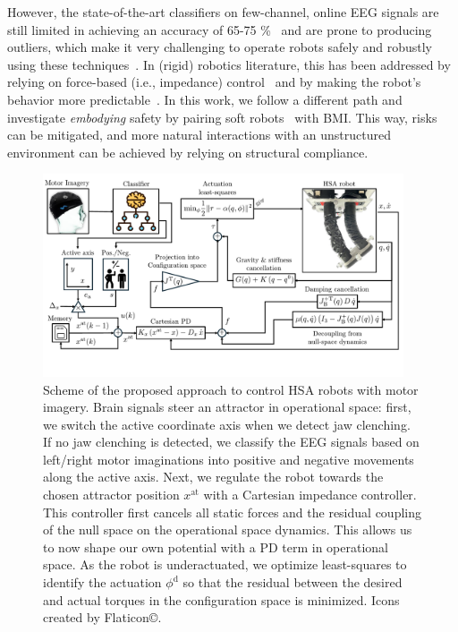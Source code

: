 \documentclass[letterpaper, 10pt, conference]{ieeeconf}      %
\begin{document}
However, the state-of-the-art classifiers on few-channel, online \gls{EEG} signals are still limited in achieving an accuracy of 65-75 \si{\percent}~\cite{arpaia2022non, lee2024noir} and are prone to producing outliers, which make it very challenging to operate robots safely and robustly using these techniques~\cite{liu2024cognitive}. In (rigid) robotics literature, this has been addressed by relying on force-based (i.e., impedance) control~\cite{schiatti2017soft} and by making the robot's behavior more predictable~\cite{aldini2019effect}.
%
%
In this work, we follow a different path and investigate \textit{embodying} safety by pairing soft robots~\cite{rus2015design, della2020softencyclopedia} 
with \gls{BMI}. This way, risks can be mitigated, and more natural interactions with an unstructured environment can be achieved by relying on structural compliance.

\begin{figure}
    \centering
    \includegraphics[width=0.95\textwidth]{braincontrol/figures/control_scheme/control_scheme_v2_cropped.pdf}
    \caption{Scheme of the proposed approach to control HSA robots with motor imagery. Brain signals steer an attractor in operational space: first, we switch the active coordinate axis when we detect jaw clenching. If no jaw clenching is detected, we classify the EEG signals based on left/right motor imaginations into positive and negative movements along the active axis. Next, we regulate the robot towards the chosen attractor position $x^\mathrm{at}$ with a Cartesian impedance controller. This controller first cancels all static forces and the residual coupling of the null space on the operational space dynamics. This allows us to now shape our own potential with a PD term in operational space. As the robot is underactuated, we optimize least-squares to identify the actuation $\phi^\mathrm{d}$ so that the residual between the desired and actual torques in the configuration space is minimized. Icons created by Flaticon\copyright.}
    \label{fig:braincontrol:control_scheme}
\end{figure}
\end{document}
